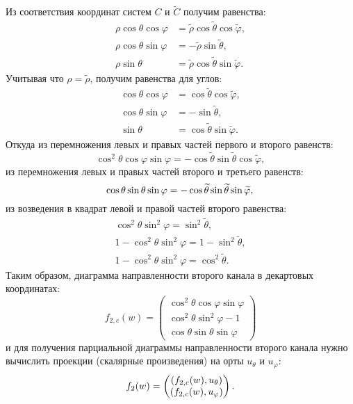 Из соответствия координат систем $C$ и $\widetilde{C}$ получим равенства:
\begin{align*}
    \rho \cos \theta \cos \varphi & = \widetilde{\rho} \cos \widetilde{\theta} \cos \widetilde{\varphi} , \\
    \rho \cos \theta \sin \varphi & = - \widetilde{\rho} \sin \widetilde{\theta} , \\
    \rho \sin \theta              & = \widetilde{\rho} \cos \widetilde{\theta} \sin \widetilde{\varphi} .
\end{align*}
Учитывая что $\rho = \widetilde{\rho}$, получим равенства для углов:
\begin{align*}
    \cos \theta \cos \varphi & = \cos \widetilde{\theta} \cos \widetilde{\varphi} , \\
    \cos \theta \sin \varphi & = - \sin \widetilde{\theta} , \\
    \sin \theta              & = \cos \widetilde{\theta} \sin \widetilde{\varphi} .
\end{align*}
Откуда из перемножения левых и правых частей первого и второго равенств:
\[
    \cos^2 \theta \cos \varphi \sin \varphi = - \cos \widetilde{\theta} \sin \widetilde{\theta} \cos \widetilde{\varphi} ,
\]
из перемножения левых и правых частей второго и третьего равенств:
\[
    \cos \theta \sin \theta \sin \varphi = - \cos \widetilde{\theta} \sin \widetilde{\theta} \sin \widetilde{\varphi}, \\
\]
из возведения в квадрат левой и правой частей второго равенства:
\begin{gather*}
    \cos^2 \theta \sin^2 \varphi = \sin^2 \widetilde{\theta} , \\
    1 - \cos^2 \theta \sin^2 \varphi = 1 - \sin^2 \widetilde{\theta} , \\
    1 - \cos^2 \theta \sin^2 \varphi = \cos^2 \widetilde{\theta} .
\end{gather*}
Таким образом, диаграмма направленности второго канала в декартовых координатах:
\[
    f_{2,c}(w)
    = \begin{pmatrix}
          \cos^2 \theta \cos \varphi \sin \varphi \\
          \cos^2 \theta \sin^2 \varphi - 1        \\
          \cos \theta \sin \theta \sin \varphi
    \end{pmatrix}
\]
и для получения парциальной диаграммы направленности второго канала нужно вычислить проекции (скалярные произведения) на орты $u_\theta$ и $u_\varphi$:
\[
    f_2(w)
    = \begin{pmatrix}
          \left ( f_{2,c}(w), u_\theta \right ) \\
          \left ( f_{2,c}(w), u_\varphi \right )
    \end{pmatrix} .
\]

